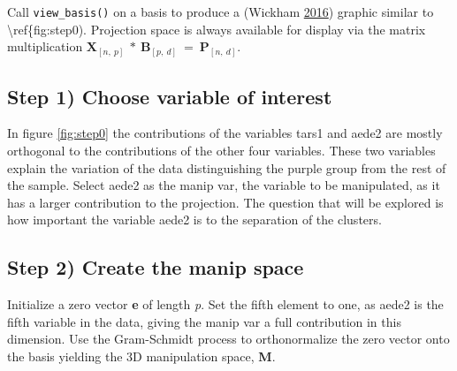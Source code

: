 Call \texttt{view\_basis()} on a basis to produce a 
(Wickham \protect\hyperlink{ref-wickham_ggplot2:_2016}{2016}) graphic
similar to \textbackslash ref\{fig:step0). Projection space is always
available for display via the matrix multiplication
\(\textbf{X}_{[n,~p]} ~*~ \textbf{B}_{[p,~d]} ~=~ \textbf{P}_{[n,~d]}\).

\begin{Schunk}
\end{Schunk}

\hypertarget{step-1-choose-variable-of-interest}{%
\subsection{Step 1) Choose variable of
interest}\label{step-1-choose-variable-of-interest}}

In figure \ref{fig:step0} the contributions of the variables tars1 and
aede2 are mostly orthogonal to the contributions of the other four
variables. These two variables explain the variation of the data
distinguishing the purple group from the rest of the sample. Select
aede2 as the manip var, the variable to be manipulated, as it has a
larger contribution to the projection. The question that will be
explored is how important the variable aede2 is to the separation of the
clusters.

\hypertarget{step-2-create-the-manip-space}{%
\subsection{Step 2) Create the manip
space}\label{step-2-create-the-manip-space}}

Initialize a zero vector \textbf{e} of length \emph{p}. Set the fifth
element to one, as aede2 is the fifth variable in the data, giving the
manip var a full contribution in this dimension. Use the Gram-Schmidt
process to orthonormalize the zero vector onto the basis yielding the 3D
manipulation space, \textbf{M}.


